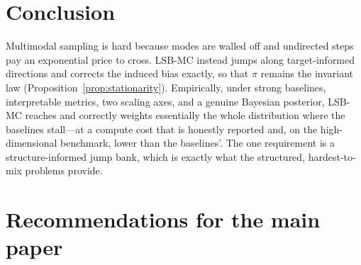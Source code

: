 \documentclass[11pt]{article}
\theoremstyle{plain}
\theoremstyle{remark}
\begin{document}
\section{Conclusion}\label{sec:conclusion}
Multimodal sampling is hard because modes are walled off and undirected steps pay
an exponential price to cross. LSB-MC instead jumps along target-informed
directions and corrects the induced bias exactly, so that $\pi$ remains the
invariant law (Proposition~\ref{prop:stationarity}). Empirically, under strong
baselines, interpretable metrics, two scaling axes, and a genuine Bayesian
posterior, LSB-MC reaches and correctly weights essentially the whole distribution
where the baselines stall---at a compute cost that is honestly reported and, on the
high-dimensional benchmark, lower than the baselines'. The one requirement is a
structure-informed jump bank, which is exactly what the structured, hardest-to-mix
problems provide.

\section{Recommendations for the main paper}\label{sec:recs}

\end{document}
